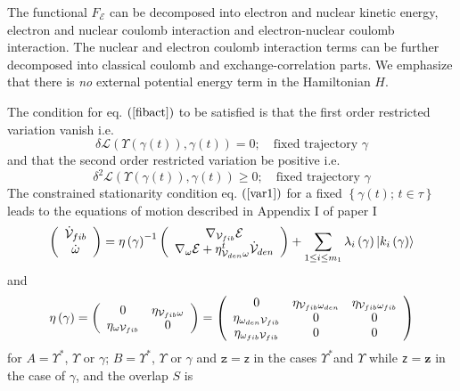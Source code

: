 \documentclass[aps,preprint]{revtex4}%
\begin{document}
The functional $F_{\mathcal{E}}$ can be decomposed into electron and nuclear
kinetic energy, electron and nuclear coulomb interaction and electron-nuclear
coulomb interaction. The nuclear and electron coulomb interaction terms can be
further decomposed into classical coulomb and exchange-correlation parts. We
emphasize that there is \emph{no }external potential energy term in the
Hamiltonian $H$.

The condition for eq. $\left(  \ref{fibact}\right)  $ to be satisfied is that
the first order restricted variation vanish i.e.
\begin{equation}
\delta\mathcal{L}\left(  \Upsilon\left(  \gamma\left(  t\right)  \right)
,\gamma\left(  t\right)  \right)  =0;\quad\text{fixed trajectory }%
\gamma\label{var1}%
\end{equation}
and that the second order restricted variation be positive i.e.
\begin{equation}
\delta^{2}\mathcal{L}\left(  \Upsilon\left(  \gamma\left(  t\right)  \right)
,\gamma\left(  t\right)  \right)  \geq0;\quad\text{fixed trajectory }\gamma
\end{equation}
The constrained stationarity condition eq. $\left(  \ref{var1}\right)  $ for a
fixed $\left\{  \gamma\left(  t\right)  ;\,t\in\tau\right\}  $ leads to the
equations of motion described in Appendix I of paper I
\begin{equation}
\left(
\begin{array}
[c]{c}%
\mathcal{\dot{V}}_{fib}\\
\dot{\omega}%
\end{array}
\right)  =\eta\left(  \mathcal{\gamma}\right)  ^{-1}\left(
\begin{array}
[c]{c}%
\nabla_{\mathcal{V}_{fib}}\mathcal{E}\\
\nabla_{\omega}\mathcal{E}+\eta_{\mathcal{V}_{den}\omega}^{t}\mathcal{\dot{V}%
}_{den}%
\end{array}
\right)  +\sum_{1\leq i\leq m_{1}}\lambda_{i}\left(  \mathcal{\gamma}\right)
\left|  k_{i}\left(  \mathcal{\gamma}\right)  \right\rangle \label{EOM}%
\end{equation}
and
\begin{equation}
\eta\left(  \mathcal{\gamma}\right)  =\left(
\begin{array}
[c]{cc}%
0 & \eta_{\mathcal{V}_{fib}\omega}\\
\eta_{\omega\mathcal{V}_{fib}} & 0
\end{array}
\right)  =\left(
\begin{array}
[c]{ccc}%
0 & \eta_{\mathcal{V}_{fib}\omega_{den}} & \eta_{\mathcal{V}_{fib}\omega
_{fib}}\\
\eta_{\omega_{den}\mathcal{V}_{fib}} & 0 & 0\\
\eta_{\omega_{fib}\mathcal{V}_{fib}} & 0 & 0
\end{array}
\right)  \label{etamat}%
\end{equation}
for $A=\mathcal{\Upsilon}^{\ast}$, $\mathcal{\Upsilon}$ or $\gamma$;
$B=\mathcal{\Upsilon}^{\ast}$, $\mathcal{\Upsilon}$ or $\gamma$ and
$\mathtt{z}=\mathsf{z}$ in the cases $\mathcal{\Upsilon}^{\ast}$and
$\mathcal{\Upsilon}$ while \texttt{z}$=\mathbf{z}$ in the case of $\gamma$,
and the overlap $S$ is
\end{document}
